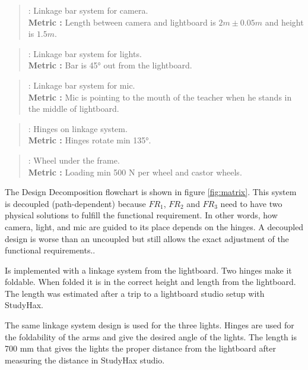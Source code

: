 \documentclass[a4paper]{jpconf}
\begin{document}
\begin{quote} 
	\textbf{} : Linkage bar system for camera. \\ 
	\textbf{Metric :} Length between camera and lightboard is $2 m \pm 0.05 m$ and height is $1.5 m$.
\end{quote}

\begin{quote} 
	\textbf{} : Linkage bar system for lights.
	\\ \textbf{Metric :} Bar is 45° out from the lightboard.
\end{quote}

\begin{quote} 
	\textbf{} : Linkage bar system for mic.
	\\ \textbf{Metric :} Mic is pointing to the mouth of the teacher when he stands in the middle of lightboard.
\end{quote}

\begin{quote} 
	\textbf{} : Hinges on linkage system.
	\\ \textbf{Metric :} Hinges rotate min 135°.
\end{quote}

\begin{quote} 
	\textbf{} : Wheel under the frame.
	\\ \textbf{Metric :} Loading min 500 N per wheel and castor wheels.
\end{quote}

The Design Decomposition flowchart is shown in figure \ref{fig:matrix}.
This system is decoupled (path-dependent) because $FR_1$, $FR_2$ and $FR_3$ need to have two physical solutions to fulfill the functional requirement.
In other words, how camera, light, and mic are guided to its place depends on the hinges.
A decoupled design is worse than an uncoupled but still allows the exact adjustment of the functional requirements.\cite{system_design}.


\textbf{} Is implemented with a linkage system from the lightboard.
Two hinges make it foldable.
When folded it is in the correct height and length from the lightboard.
The length was estimated after a trip to a lightboard studio setup with StudyHax.

\textbf{} The same linkage system design is used for the three lights.
Hinges are used for the foldability of the arms and give the desired angle of the lights.
The length is 700 mm that gives the lights the proper distance from the lightboard after measuring the distance in StudyHax studio.
\end{document}
